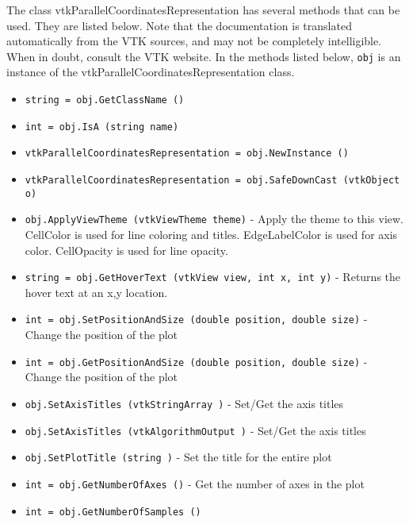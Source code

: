 The class vtkParallelCoordinatesRepresentation has several methods that can be used.
  They are listed below.
Note that the documentation is translated automatically from the VTK sources,
and may not be completely intelligible.  When in doubt, consult the VTK website.
In the methods listed below, \verb|obj| is an instance of the vtkParallelCoordinatesRepresentation class.
\begin{itemize}
\item  \verb|string = obj.GetClassName ()|

\item  \verb|int = obj.IsA (string name)|

\item  \verb|vtkParallelCoordinatesRepresentation = obj.NewInstance ()|

\item  \verb|vtkParallelCoordinatesRepresentation = obj.SafeDownCast (vtkObject o)|

\item  \verb|obj.ApplyViewTheme (vtkViewTheme theme)| -  Apply the theme to this view.  CellColor is used for line coloring
 and titles.  EdgeLabelColor is used for axis color. CellOpacity is 
 used for line opacity.

\item  \verb|string = obj.GetHoverText (vtkView view, int x, int y)| -  Returns the hover text at an x,y location.

\item  \verb|int = obj.SetPositionAndSize (double position, double size)| -  Change the position of the plot

\item  \verb|int = obj.GetPositionAndSize (double position, double size)| -  Change the position of the plot

\item  \verb|obj.SetAxisTitles (vtkStringArray )| -  Set/Get the axis titles

\item  \verb|obj.SetAxisTitles (vtkAlgorithmOutput )| -  Set/Get the axis titles

\item  \verb|obj.SetPlotTitle (string )| -  Set the title for the entire plot

\item  \verb|int = obj.GetNumberOfAxes ()| -  Get the number of axes in the plot

\item  \verb|int = obj.GetNumberOfSamples ()|


\end{itemize}
